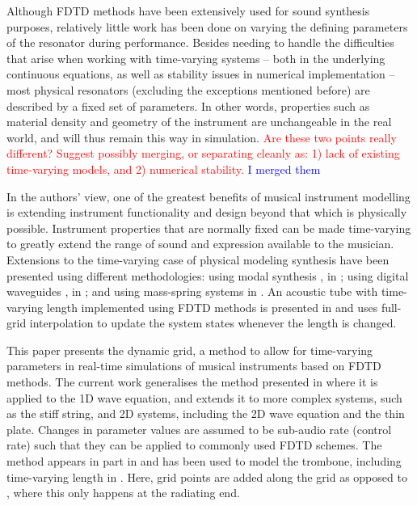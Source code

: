 \documentclass[fleqn]{jaes}
\def\SBcomment[#1]{\textcolor{red}{#1}}
\def\SWcomment[#1]{\textcolor{blue}{#1}}
\begin{document}
Although FDTD methods have been extensively used for sound synthesis purposes, relatively little work has been done on varying the defining parameters of the resonator during performance. Besides needing to handle the difficulties that arise when working with time-varying systems -- both in the underlying continuous equations, as well as stability issues in numerical implementation -- most physical resonators (excluding the exceptions mentioned before) are described by a fixed set of parameters. In other words, properties such as material density and geometry of the instrument are unchangeable in the real world, and will thus remain this way in simulation. %
\SBcomment[Are these two points really different? Suggest possibly merging, or separating cleanly as: 1) lack of existing time-varying models, and 2) numerical stability.] \SWcomment[I merged them]%

In the authors' view, one of the greatest  benefits of musical instrument modelling is extending instrument functionality and design beyond that which is physically possible. Instrument properties that are normally fixed can be made time-varying to greatly extend the range of sound and expression available to the musician. Extensions to the time-varying case of physical modeling synthesis have been presented using different methodologies: using modal synthesis \cite{morrison1993mosaic}, in \cite{Mehes2016, Willemsen2017}; using digital waveguides \cite{Smith1992}, in \cite{Michon2014, serafin2005virtual}; and using mass-spring systems in \cite{leonard2013virtual}. An acoustic tube with time-varying length implemented using FDTD methods is presented in \cite{Hofmann2019} and uses full-grid interpolation to update the system states whenever the length is changed.

This paper presents the dynamic grid, a method to allow for time-varying parameters in real-time simulations of musical instruments based on FDTD methods. The current work generalises the method presented in \cite{Willemsen2021a} where it is applied to the 1D wave equation, and extends it to more complex systems, such as the stiff string, and 2D systems, including the 2D wave equation and the thin plate. Changes in parameter values are assumed to be sub-audio rate (control rate) such that they can be applied to commonly used FDTD schemes.
The method appears in part in \cite[Ch. 12]{Willemsen2021Thesis} and has been used to model the trombone, including time-varying length in \cite{Willemsen2021b}. Here, grid points are added along the grid as opposed to \cite{Hofmann2019}, where this only happens at the radiating end. 
\end{document}
